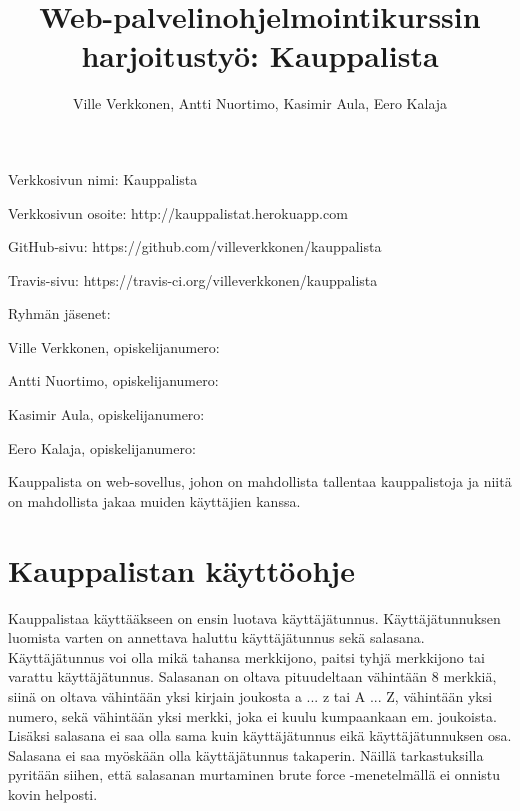 \documentclass[12pt,a4paper]{article}
\begin{document}
\renewcommand\refname{Lähteet} %
\renewcommand{\BOthers}[1]{ym.\hbox{}}%
\renewcommand{\BOthersPeriod}[1]{ym.\hbox{}}%

\title{Web-palvelinohjelmointikurssin harjoitustyö: Kauppalista}
\author{Ville Verkkonen, Antti Nuortimo, Kasimir Aula, Eero Kalaja}
\maketitle

Verkkosivun nimi: Kauppalista

Verkkosivun osoite: http://kauppalistat.herokuapp.com

GitHub-sivu: https://github.com/villeverkkonen/kauppalista

Travis-sivu: https://travis-ci.org/villeverkkonen/kauppalista

Ryhmän jäsenet:

Ville Verkkonen, opiskelijanumero:

Antti Nuortimo, opiskelijanumero:

Kasimir Aula, opiskelijanumero:

Eero Kalaja, opiskelijanumero:

Kauppalista on web-sovellus, johon on mahdollista tallentaa kauppalistoja ja niitä on mahdollista jakaa muiden käyttäjien kanssa.

\pagebreak

\section*{Kauppalistan käyttöohje}

Kauppalistaa käyttääkseen on ensin luotava käyttäjätunnus. Käyttäjätunnuksen luomista varten on annettava haluttu käyttäjätunnus sekä salasana. Käyttäjätunnus voi olla mikä tahansa merkkijono, paitsi tyhjä merkkijono tai varattu käyttäjätunnus. Salasanan on oltava pituudeltaan vähintään 8 merkkiä, siinä on oltava vähintään yksi kirjain joukosta a ... z tai A ... Z, vähintään yksi numero, sekä vähintään yksi merkki, joka ei kuulu kumpaankaan em. joukoista. Lisäksi salasana ei saa olla sama kuin käyttäjätunnus eikä käyttäjätunnuksen osa. Salasana ei saa myöskään olla käyttäjätunnus takaperin. Näillä tarkastuksilla pyritään siihen, että salasanan murtaminen brute force -menetelmällä ei onnistu kovin helposti.
\end{document}
